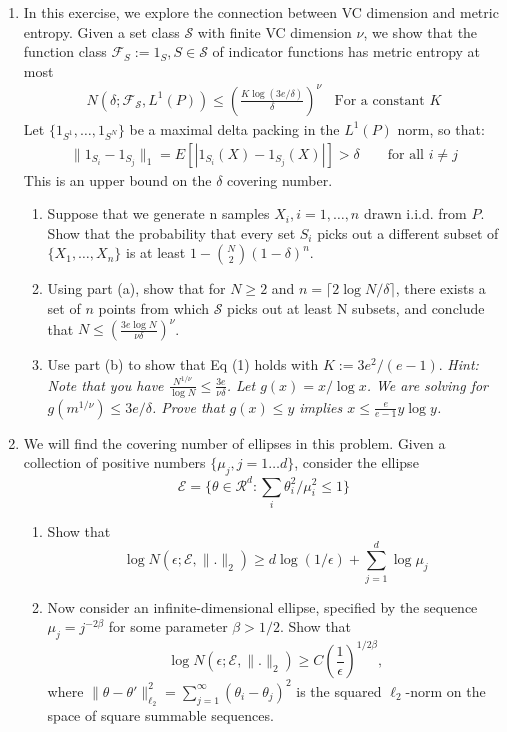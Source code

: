 \documentclass[11pt]{article}
\newcommand{\F}{\mathcal{F}}
\newcommand{\R}{\mathcal{R}}
\renewcommand{\S}{\mathcal{S}}
\begin{document}
\begin{enumerate}
\item In this exercise, we explore the connection between VC dimension and
metric entropy. Given a set class $\S$ with finite VC dimension $\nu$, we show that the
function class $\F_S := {1_S, S \in \S}$ of indicator functions has metric entropy at most
\begin{align}
N(\delta;\F_\S,L^1(P))\leq \left(\frac{K\log(3e/\delta)}{\delta}\right)^{\nu}\ \ \ \ \mbox{For a constant $K$}
\end{align}
Let $\{1_{S^1},\dots,1_{S^N}\}$ be a maximal delta packing in the $L^1(P)$ norm, so that:
\begin{align*}
\|1_{S_i}-1_{S_j}\|_1=E[|1_{S_i}(X)-1_{S_j}(X)|]>\delta \qquad \mbox{for all $i\neq j$}
\end{align*}
This is an upper bound on the $\delta$ covering number.
\begin{enumerate}
	\item Suppose that we generate n samples $X_i, i = 1, \dots , n$ drawn i.i.d. from $P$. Show 
that the probability that every set $S_i$ picks out a different subset of $\{X_1,\dots, X_n\}$ is at least $1-{N\choose 2}(1-\delta)^n$.
\item Using part (a), show that for $N \geq 2$ and $n = \lceil 2 \log N/\delta\rceil$, there exists a set of $n$ points
from which $\S$ picks out at least N subsets, and conclude that $N \leq \left(\frac{3e \log N}{\nu\delta}\right)^\nu$.
\item Use part (b) to show that Eq (1) holds with $K:=3e^2/(e-1)$.
\textit{Hint: Note that you have $\frac{N^{1/\nu}}{\log N}\leq \frac{3e}{\nu\delta}$. Let $g(x)=x/\log x$. We are solving for $g(m^{1/\nu})\leq 3e/\delta$. Prove that $g(x)\leq y$ implies $x\leq \frac{e}{e-1}y\log y$.}
\end{enumerate}
\item We will find the covering number of ellipses in this problem.  Given a collection of positive numbers $\{\mu_j,j=1\dots d\}$, consider the ellipse $$\mathcal{E}=\{\theta\in\R^d : \sum_i \theta_i^2/\mu_i^2\leq 1\}$$
\begin{enumerate}
	\item Show that $$\log N(\epsilon; \mathcal{E},\|.\|_2)\geq d\log (1/\epsilon)+\sum_{j=1}^d\log \mu_j$$
	\item Now consider an infinite-dimensional ellipse, specified by the sequence $\mu_j = j^{-2\beta}$
for some parameter $\beta > 1/2$. Show that
$$\log N(\epsilon; \mathcal{E},\|.\|_2)\geq C \left(\frac{1}{\epsilon}\right)^{1/2\beta},$$
where $\|\theta-\theta'\|_{\ell_2}^2=\sum_{j=1}^\infty (\theta_i-\theta_j)^2$ is the squared $\ell_2$-norm on the space of square summable sequences.
\end{enumerate}
\begin{comment}
\item For any fixed $\theta$, define the real-valued 
function $f_\theta(x) := 1 − \exp(-\theta|x|)$, and consider the function class
$$\F=\{f_\theta:[0,1]\rightarrow \R | \theta\in[0,1]	\}$$
Using the uniform norm as a metric, i.e. 


\end{comment}
\end{enumerate}
\end{document}

